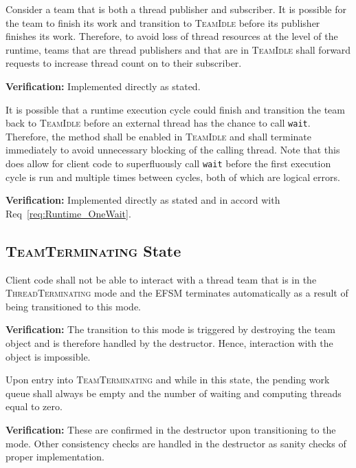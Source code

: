 \documentclass{article}
\newcommand{\TeamIdle}          {\textsc{TeamIdle}}
\newcommand{\TeamTerminating}   {\textsc{TeamTerminating}}
\newcommand{\ThreadTerminating} {\textsc{ThreadTerminating}}
\begin{document}
\begin{req}
Consider a team that is both a thread publisher and subscriber.  It is possible
for the team to finish its work and transition to {\TeamIdle} before its
publisher finishes its work.  Therefore, to avoid loss of thread resources at
the level of the runtime, teams that are thread publishers and that are in
{\TeamIdle} shall forward requests to increase thread count on to their
subscriber.
\end{req}
\textbf{Verification:}\hspace{0.125in}  Implemented directly as stated.

\begin{req}
It is possible that a runtime execution cycle could finish and transition the
team back to {\TeamIdle} before an external thread has the chance to call
\texttt{wait}.  Therefore, the method shall be enabled in {\TeamIdle} and shall
terminate immediately to avoid unnecessary blocking of the calling thread.  Note
that this does allow for client code to superfluously call \texttt{wait} before
the first execution cycle is run and multiple times between cycles, both of
which are logical errors.
\end{req}
\textbf{Verification:}\hspace{0.125in}  Implemented directly as stated and in
accord with Req~\ref{req:Runtime_OneWait}.  

\subsection{{\TeamTerminating} State}
\begin{req}
Client code shall not be able to interact with a thread team that is in the
{\ThreadTerminating} mode and the EFSM terminates automatically as a result of
being transitioned to this mode.
\end{req}
\textbf{Verification:}\hspace{0.125in} The transition to this mode is triggered
by destroying the team object and is therefore handled by the destructor.
Hence, interaction with the object is impossible.

\begin{req}
Upon entry into {\TeamTerminating} and while in this state, the pending work
queue shall always be empty and the number of waiting and computing threads
equal to zero.
\end{req}
\textbf{Verification:}\hspace{0.125in}  These are confirmed in the destructor
upon transitioning to the mode.  Other consistency checks are handled in the
destructor as sanity checks of proper implementation.
\end{document}
